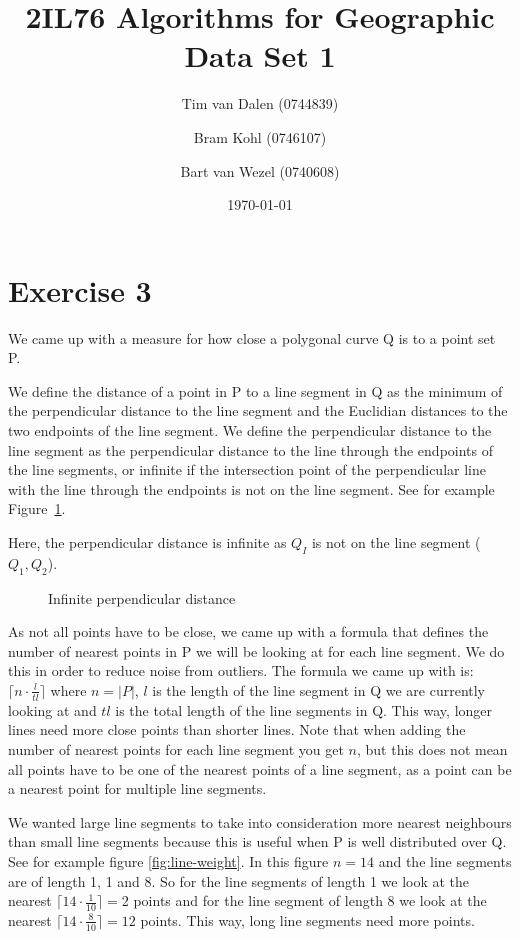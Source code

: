 \documentclass[a4paper,11pt]{article}
\title{
	2IL76 Algorithms for Geographic Data Set 1 \\
}
\author{
	Tim van Dalen (0744839)
	\and
	Bram Kohl (0746107)
	\and
	Bart van Wezel (0740608)
}
\date{\today}
\begin{document}
	\maketitle
	
\section*{Exercise 3}
We came up with a measure for how close a polygonal curve Q is to a point set P.

We define the distance of a point in P to a line segment in Q as the minimum of the perpendicular distance to the line segment and the Euclidian distances to the two endpoints of the line segment.
We define the perpendicular distance to the line segment as the perpendicular distance to the line through the endpoints of the line segments, or infinite if the intersection point of the perpendicular line with the line through the endpoints is not on the line segment.
See for example Figure~\ref{fig:perp-distance}.

Here, the perpendicular distance is infinite as $Q_I$ is not on the line segment ($Q_1,Q_2$).

\begin{figure}[H]
	\centering
	\label{fig:perp-distance}
	\def\svgwidth{0.5\textwidth}
	
	\caption{Infinite perpendicular distance}
\end{figure}

As not all points have to be close, we came up with a formula that defines the number of nearest points in P we will be looking at for each line segment.
We do this in order to reduce noise from outliers.
The formula we came up with is: $\lceil n\cdot \frac{l}{tl}\rceil$ where $n = |P|$, $l$ is the length of the line segment in Q we are currently looking at and $tl$ is the total length of the line segments in Q.
This way, longer lines need more close points than shorter lines.
Note that when adding the number of nearest points for each line segment you get $n$, but this does not mean all points have to be one of the nearest points of a line segment, as a point can be a nearest point for multiple line segments.

We wanted large line segments to take into consideration more nearest neighbours than small line segments because this is useful when P is well distributed over Q.
See for example figure \ref{fig:line-weight}. In this figure $n = 14$ and the line segments are of length 1, 1 and 8. So for the line segments of length 1 we look at the nearest $\lceil 14\cdot \frac{1}{10}\rceil = 2$ points and for the line segment of length 8 we look at the nearest $\lceil 14\cdot \frac{8}{10}\rceil = 12$ points. This way, long line segments need more points.
\end{document}
